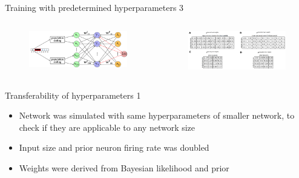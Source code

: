 \documentclass[aspectratio=169]{beamer}
\begin{document}
\begin{frame}{Training with predetermined hyperparameters 3}
 \vspace{-1.0cm}
   \begin{columns}
     \begin{column}{0.4\textwidth}
        \begin{figure}
        \includegraphics[width=1\linewidth]{../inkscape/networkPlanWeightComparison.png}
      \end{figure} 
     \end{column}
     \begin{column}{0.6\textwidth}
		\begin{figure}
        \includegraphics[width=1\linewidth]{../Latex/figures/1D/training/weightComparison.png}
      \end{figure} 
      \end{column}
    \end{columns}
\end{frame}


\begin{frame}{Transferability of hyperparameters 1}
  \begin{itemize}
      \item Network was simulated with same hyperparameters of smaller network, to check if they are applicable to any network size
      \item Input size and prior neuron firing rate  was doubled
      \item Weights were derived from Bayesian likelihood and prior
  \end{itemize}
\end{frame}
\end{document}

